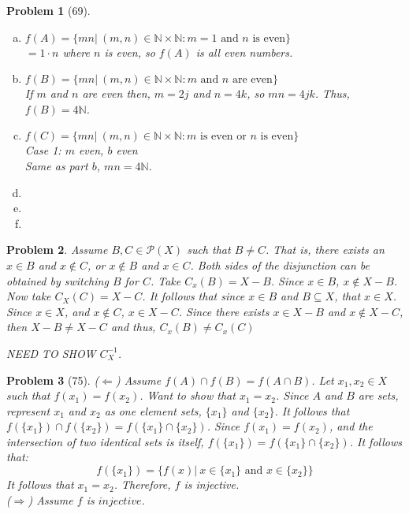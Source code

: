 \documentclass{article}
\theoremstyle{problem}
\newtheorem{prob}{Problem}
\theoremstyle{plain}
\theoremstyle{remark}
\begin{document}
\begin{prob}[69]
\begin{enumerate}[a)]\ \\[-1cm]
\item $f(A) = \{mn|\ (m,n) \in \mathbb{N} \times \mathbb{N}: m = 1 \text{ and } n \text{ is even}\}$\\
$= 1\cdot n$ where $n$ is even, so $f(A)$ is all even numbers.
\item $f(B) = \{mn|\ (m,n) \in \mathbb{N} \times \mathbb{N}: m \text{ and } n \text{ are even}\}$\\
If $m$ and $n$ are even then, $m = 2j$ and $n = 4k$, so $mn = 4jk$. Thus, $f(B) = 4\mathbb{N}$.
\item $f(C) = \{mn|\ (m,n) \in \mathbb{N} \times \mathbb{N}: m \text{ is even or } n \text{ is even}\}$\\
Case 1: $m$ even, $b$ even\\
Same as part $b$, $mn = 4\mathbb{N}$.
\item
\item 
\item 
\end{enumerate}
\end{prob}

\begin{prob}
  Assume $B,C \in \mathcal{P}(X)$ such that $B \not = C$. 
  That is, there exists an $x \in B$ and $x \not \in C$, or $x \not \in B$ and $x \in C$. 
  Both sides of the disjunction can be obtained by switching $B$ for $C$. Take $C_x(B) = X - B$. 
  Since $x \in B$, $x \not \in X - B$. 
  Now take $C_X(C) = X - C$. 
  It follows that since $x \in B$ and $B \subseteq X$, that $x \in X$. 
  Since $x \in X$, and $x \not \in C$, $x \in X - C$. 
  Since there exists $x \in X - B$ and $x \not \in X - C$, then $X - B \not = X - C$ and thus, $C_x(B) \not = C_x(C)$

NEED TO SHOW $C_X^{-1}$.
\end{prob}

\begin{prob}[75]
($\Leftarrow$) Assume $f(A) \cap f(B) = f(A \cap B)$. Let $x_1, x_2 \in X$ such that $f(x_1) = f(x_2)$. Want to show that $x_1 = x_2$. Since $A$ and $B$ are sets, represent $x_1$ and $x_2$ as one element sets, $\{x_1\}$ and $\{x_2\}$. It follows that $f(\{x_1\}) \cap f(\{x_2\}) = f(\{x_1\} \cap \{x_2\})$. Since $f(x_1) = f(x_2)$, and the intersection of two identical sets is itself, $f(\{x_1\}) = f(\{x_1\} \cap \{x_2\})$. It follows that:
$$
  f(\{x_1\}) = \{f(x)|\ x \in \{x_1\} \text{ and } x \in \{x_2\}\}  
$$
It follows that $x_1 = x_2$. Therefore, $f$ is injective.\\
($\Rightarrow$) Assume $f$ is $injective$.
\end{prob}
\end{document}
